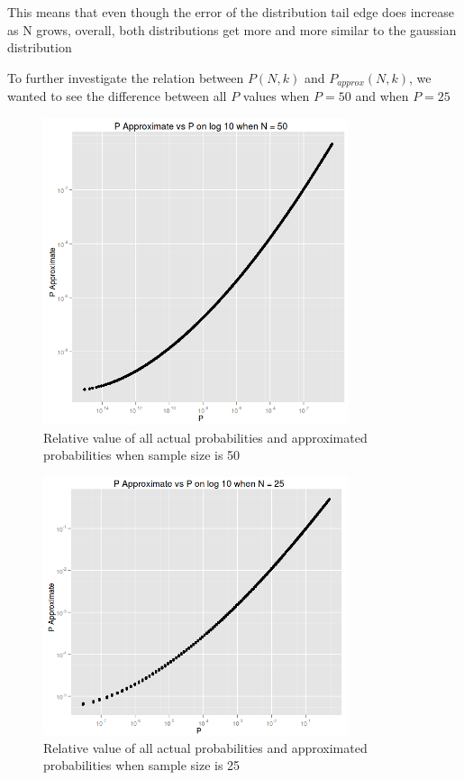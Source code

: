 \documentclass[12pt]{article}
\begin{document}
This means that even though the error of the distribution tail edge does increase as N grows, overall, both distributions get more and more similar to the gaussian distribution

To further investigate the relation between $P(N, k)$ and $P_{approx}(N, k)$, we wanted to see the difference between all $P$ values when $P = 50$ and when $P = 25$

\begin{figure}[!h]
	\centering
  \includegraphics[width=0.8\textwidth]{PvsP50}
	\caption{Relative value of all actual probabilities and approximated probabilities when sample size is 50}
	\label{fig:PvsP50}
\end{figure}

\begin{figure}[!h]
	\centering
  \includegraphics[width=0.8\textwidth]{PvsP25}
	\caption{Relative value of all actual probabilities and approximated probabilities when sample size is 25}
	\label{fig:PvsP25}
\end{figure}
\end{document}
